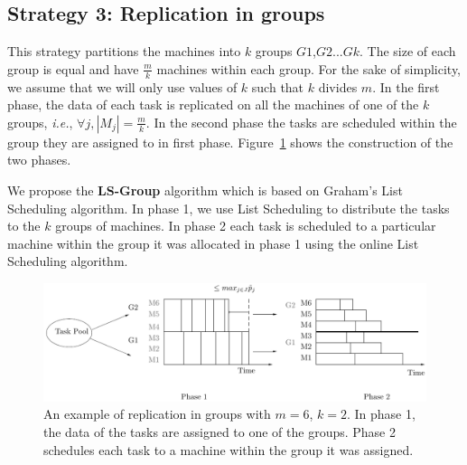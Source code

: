 \documentclass[twocolumn]{svjour3}
\begin{document}
\subsection{Strategy 3: Replication in groups}\label{sec6}


This strategy partitions the machines into $k$ groups
$G1$,$G2$...$Gk$. The size of each group is equal and have
$\frac{m}{k}$ machines within each group. For the sake of
simplicity, we assume that we will only use values of $k$ such that
$k$ divides $m$. In the first phase, the data of each task is
replicated on all the machines of one of the $k$ groups,
{\em i.e.}, $\forall j, |M_j|= \frac{m}{k}$. In the second phase the tasks
are scheduled within the group they are assigned to in first phase.
Figure~\ref{fig:Model 3} shows the construction of the two phases.

We propose the \textbf{LS-Group} algorithm which is based on Graham's
List Scheduling algorithm. In phase 1, we use List Scheduling to
distribute the tasks to the $k$ groups of machines. In phase 2 each
task is scheduled to a particular machine within the group it was
allocated in phase 1 using the online List Scheduling algorithm.

\begin{figure}[htp] 
\centering
\includegraphics[width=\linewidth]{model3.pdf}
\caption{An example of replication in groups with $m = 6$, $k = 2$. In
  phase 1, the data of the tasks are assigned to one of the
  groups. Phase 2 schedules each task to a machine within the group it was 
  assigned.}
\label{fig:Model 3}
\end{figure}
\end{document}
